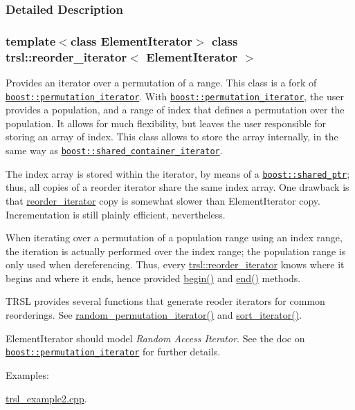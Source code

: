 \subsubsection{Detailed Description}
\subsubsection*{template$<$class ElementIterator$>$ class trsl::reorder\_\-iterator$<$ ElementIterator $>$}

Provides an iterator over a permutation of a range. This class is a fork of \href{http://www.boost.org/libs/iterator/doc/permutation_iterator.html}{\tt boost::permutation\_\-iterator}. With \href{http://www.boost.org/libs/iterator/doc/permutation_iterator.html}{\tt boost::permutation\_\-iterator}, the user provides a population, and a range of index that defines a permutation over the population. It allows for much flexibility, but leaves the user responsible for storing an array of index. This class allows to store the array internally, in the same way as \href{http://www.boost.org/libs/utility/shared_container_iterator.html}{\tt boost::shared\_\-container\_\-iterator}.

The index array is stored within the iterator, by means of a \href{http://www.boost.org/libs/smart_ptr/shared_ptr.htm}{\tt boost::shared\_\-ptr}; thus, all copies of a reorder iterator share the same index array. One drawback is that \hyperlink{classtrsl_1_1reorder__iterator}{reorder\_\-iterator} copy is somewhat slower than ElementIterator copy. Incrementation is still plainly efficient, nevertheless.

When iterating over a permutation of a population range using an index range, the iteration is actually performed over the index range; the population range is only used when dereferencing. Thus, every \hyperlink{classtrsl_1_1reorder__iterator}{trsl::reorder\_\-iterator} knows where it begins and where it ends, hence provided \hyperlink{classtrsl_1_1reorder__iterator_af8f78e62dfc60bdfb2b21e2c5632d295}{begin()} and \hyperlink{classtrsl_1_1reorder__iterator_a34cefcb91f1ea859ea6a23223ca13e1b}{end()} methods.

TRSL provides several functions that generate reoder iterators for common reorderings. See \hyperlink{namespacetrsl_afb566791dfade70af49beaa5b816e7ee}{random\_\-permutation\_\-iterator()} and \hyperlink{namespacetrsl_aa23892a3c8929e627df1618c6b5dd2df}{sort\_\-iterator()}.

{\ttfamily ElementIterator} should model {\itshape Random Access Iterator\/}. See the doc on \href{http://www.boost.org/libs/iterator/doc/permutation_iterator.html}{\tt boost::permutation\_\-iterator} for further details. \begin{Desc}
\item[Examples: ]\par


\hyperlink{trsl__example2_8cpp-example}{trsl\_\-example2.cpp}.\end{Desc}


